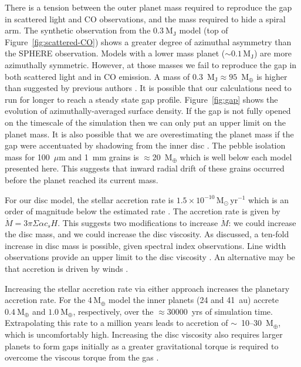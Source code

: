 \documentclass[usenatbib,a4paper,times]{mnras}
\renewcommand{\sun}{\mathrm{M}_{\odot}}
\renewcommand{\earth}{\mathrm{M}_{\oplus}}
\begin{document}
There is a tension between the outer planet mass required to reproduce the gap
in scattered light and CO observations, and the mass required to hide a spiral
arm. The synthetic observation from the $0.3~\mathrm{M_J}$ model (top of
Figure~\ref{fig:scattered-CO}) shows a greater degree of azimuthal asymmetry
than the SPHERE observation. Models with a lower mass planet ($\sim
0.1\,\mathrm{M_J}$) are more azimuthally symmetric. However, at those masses we
fail to reproduce the gap in both scattered light and in CO emission. A mass of
0.3~$\mathrm{M_J} \approx 95$~$\earth{}$ is higher than suggested by previous
authors \citep{dong:2017b, van-boekel:2017}. It is possible that our
calculations need to run for longer to reach a steady state gap profile.
Figure~\ref{fig:gap} shows the evolution of azimuthally-averaged surface
density. If the gap is not fully opened on the timescale of the simulation then
we can only put an upper limit on the planet mass. It is also possible that we
are overestimating the planet mass if the gap were accentuated by shadowing from
the inner disc \citep{debes:2013, debes:2017, poteet:2018}.  The pebble
isolation mass \citep{bitsch:2018} for 100~$\mu$m and 1~mm grains is
$\approx$20~$\earth{}$ which is well below each model presented here.  This
suggests that inward radial drift of these grains occurred before the planet
reached its current mass.

For our disc model, the stellar accretion rate is $1.5\times
10^{-10}\,\sun{}\,\mathrm{yr}^{-1}$ which is an order of magnitude below the
estimated rate \citep{brickhouse:2012}. The accretion rate is given by $\dot{M}
= 3\pi\Sigma\alpha c_s H$. This suggests two modifications to increase
$\dot{M}$: we could increase the disc mass, and we could increase the disc
viscosity. As discussed, a ten-fold increase in disc mass is possible, given
spectral index observations. Line width observations provide an upper limit
to the disc viscosity \citep{flaherty:2018}. An alternative may be that
accretion is driven by winds \citep{simon:2017a}.

Increasing the stellar accretion rate via either approach increases the
planetary accretion rate. For the 4$\,\earth{}$ model the inner planets (24 and
41~au) accrete $0.4~\earth{}$ and $1.0~\earth{}$, respectively, over the
$\approx30000$~yrs of simulation time. Extrapolating this rate to a million
years leads to accretion of $\sim$~10--30~$\earth{}$, which is uncomfortably
high. Increasing the disc viscosity also requires larger planets to form gaps
initially as a greater gravitational torque is required to overcome the viscous
torque from the gas \citep{dipierro:2016}.
\end{document}
